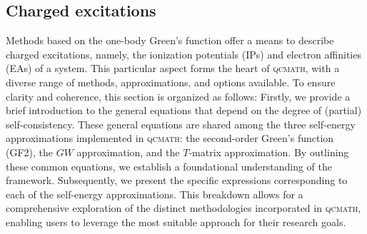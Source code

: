 \documentclass[aip,jcp,reprint,noshowkeys,superscriptaddress]{revtex4-1}
\newcommand{\qcmath}{\textsc{qcmath}\xspace}
\begin{document}
\subsection{Charged excitations}
\label{sec:charged_excitations}
Methods based on the one-body Green's function offer a means to describe charged excitations, namely, the ionization potentials (IPs) and electron affinities (EAs) of a system. \cite{CsanakBook,FetterBook,MartinBook,MattuckBook} This particular aspect forms the heart of \qcmath, with a diverse range of methods, approximations, and options available. To ensure clarity and coherence, this section is organized as follows:
Firstly, we provide a brief introduction to the general equations that depend on the degree of (partial) self-consistency. These general equations are shared among the three self-energy approximations implemented in \qcmath: the second-order Green's function (GF2), the $GW$ approximation, and the $T$-matrix approximation. By outlining these common equations, we establish a foundational understanding of the framework.
Subsequently, we present the specific expressions corresponding to each of the self-energy approximations. This breakdown allows for a comprehensive exploration of the distinct methodologies incorporated in \qcmath, enabling users to leverage the most suitable approach for their research goals.
\end{document}
